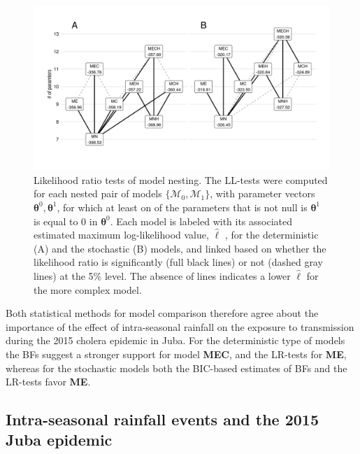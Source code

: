 \begin{figure}
    \centering
    \includegraphics[width = \textwidth, trim = 11mm 19mm 10mm 12mm, clip]{fig_cholera-rainfall/Lemaitre_ACTROP_2018_42_R1_fig3.png}
    \caption{Likelihood ratio tests of model nesting. The LL-tests were computed for each nested pair of models $\{\mathcal{M}_0, \mathcal{M}_1\}$, with parameter vectors $\boldsymbol{\theta}^0,\boldsymbol{\theta}^1$, for which at least on of the parameters that is not null is $\boldsymbol{\theta}^1$ is equal to 0 in $\boldsymbol{\theta}^0$. Each model is labeled with its associated estimated maximum log-likelihood value, $\hat{\ell}$ , for the deterministic (A) and the stochastic (B) models, and linked based on whether the likelihood ratio is significantly (full black lines) or not (dashed gray lines) at the 5\% level. The absence of lines indicates a lower $\hat{\ell}$ for the more complex model.} 
    \label{fig:lltests}
\end{figure}

Both statistical methods for model comparison therefore agree about the importance of the effect of intra-seasonal rainfall on the exposure to transmission during the 2015 cholera epidemic in Juba. For the deterministic type of models the BFs suggest a stronger support for model \textbf{MEC}, and the LR-tests for \textbf{ME}, whereas for the stochastic models both the BIC-based estimates of BFs and the LR-tests favor \textbf{ME}. 

\subsection{Intra-seasonal rainfall events and the 2015 Juba epidemic}

